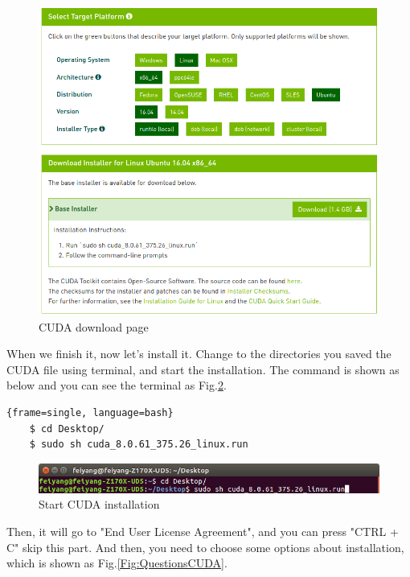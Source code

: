 \documentclass[12pt,letterpaper]{article}
\begin{document}
	\begin{figure}[http]
		\centering
		\includegraphics[scale=0.45]{./CUDAPage.png}
		\caption{\label{Fig:CUDAPage}CUDA download page}
	\end{figure}  

	When we finish it, now let's install it. Change to the directories you saved the CUDA file using terminal, and start the installation. The command is shown as below and you can see the terminal as  
	Fig.\ref{Fig:StartCUDA}.
	\begin{lstlisting}{frame=single, language=bash}
	$ cd Desktop/
	$ sudo sh cuda_8.0.61_375.26_linux.run
	\end{lstlisting}
	
	\begin{figure}[http]
		\centering
		\includegraphics[scale=0.5]{./StartCUDA.png}
		\caption{\label{Fig:StartCUDA}Start CUDA installation}
	\end{figure}
	
	Then, it will go to "End User License Agreement", and you can press "CTRL + C" skip this part. And then, you need to choose some options about installation, which is shown as Fig.\ref{Fig:QuestionsCUDA}. 
	
\end{document}
